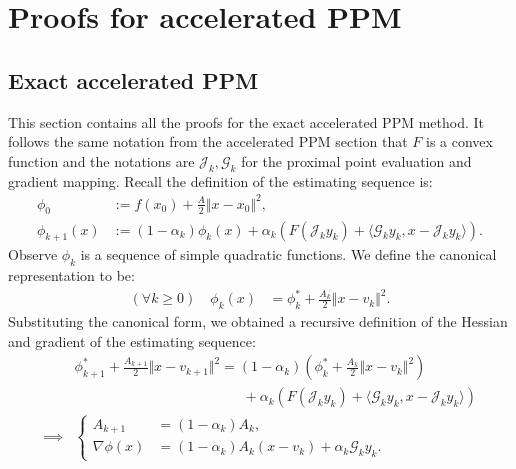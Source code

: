 \documentclass[12pt]{article}
\begin{document}
    
\section{Proofs for accelerated PPM}
    \subsection{Exact accelerated PPM}
        This section contains all the proofs for the exact accelerated PPM method. 
        It follows the same notation from the accelerated PPM section that $F$ is a convex function and the notations are $\mathcal J_k, \mathcal G_k$ for the proximal point evaluation and gradient mapping. 
        Recall the definition of the estimating sequence is: 
        \begin{align*}
            \phi_0 &:= f(x_0) + \frac{A}{2}\Vert x - x_0\Vert^2, 
            \\
            \phi_{k + 1}(x) &:= 
            (1 - \alpha_k)\phi_k(x)
            + 
            \alpha_k(F(\mathcal J_k y_k) + \langle \mathcal G_k y_k, x - \mathcal J_k y_k\rangle). 
        \end{align*}
        Observe $\phi_k$ is a sequence of simple quadratic functions. 
        We define the canonical representation to be: 
        \begin{align*}
            (\forall k \ge 0) \quad 
            \phi_k(x) &= \phi_k^* + \frac{A_k}{2} \Vert x - v_k\Vert^2. 
        \end{align*}
        Substituting the canonical form, we obtained a recursive definition of the Hessian and gradient of the estimating sequence: 
        \begin{align*}
            &
            \phi_{k+ 1}^* + \frac{A_{k + 1}}{2}\Vert x - v_{k + 1}\Vert^2
            = 
            (1 - \alpha_k)
            \left(\phi_k^* + \frac{A_k}{2}\Vert x - v_k\Vert^2\right)
            \\ & \hspace{12em}
                + 
                \alpha_k(F(\mathcal J_k y_k) + \langle \mathcal G_k y_k, x - \mathcal J_k y_k\rangle)
            \\
            \implies 
            &
            \left\lbrace
            \begin{aligned}
                A_{k + 1} 
                &= (1 - \alpha_k)A_k, 
                \\
                \nabla \phi(x)
                &= 
                (1 - \alpha_k)A_k(x - v_k) + \alpha_k \mathcal G_ky_k. 
            \end{aligned}
            \right.
        \end{align*}
\end{document}
